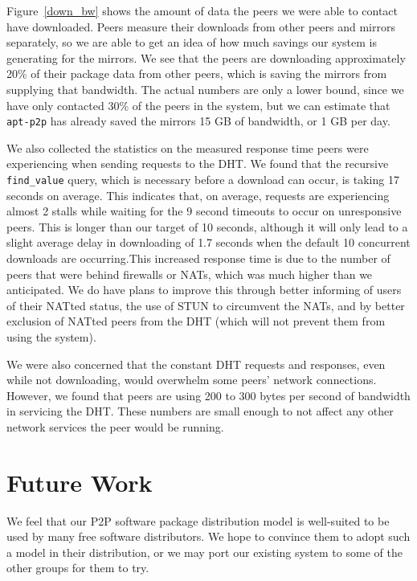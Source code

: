 \documentclass[conference]{IEEEtran}
\begin{document}
Figure~\ref{down_bw} shows the amount of data the peers we were able
to contact have downloaded. Peers measure their downloads from other
peers and mirrors separately, so we are able to get an idea of how
much savings our system is generating for the mirrors. We see that
the peers are downloading approximately 20\% of their package data
from other peers, which is saving the mirrors from supplying that
bandwidth. The actual numbers are only a lower bound, since we have
only contacted 30\% of the peers in the system, but we can estimate
that \texttt{apt-p2p} has already saved the mirrors 15 GB of
bandwidth, or 1 GB per day.

We also collected the statistics on the measured response time peers
were experiencing when sending requests to the DHT. We found that
the recursive \texttt{find\_value} query, which is necessary before
a download can occur, is taking 17 seconds on average. This
indicates that, on average, requests are experiencing almost 2
stalls while waiting for the 9 second timeouts to occur on
unresponsive peers. This is longer than our target of 10 seconds,
although it will only lead to a slight average delay in downloading
of 1.7 seconds when the default 10 concurrent downloads are
occurring.This increased response time is due to the number of peers
that were behind firewalls or NATs, which was much higher than we
anticipated. We do have plans to improve this through better
informing of users of their NATted status, the use of STUN
\cite{STUN} to circumvent the NATs, and by better exclusion of
NATted peers from the DHT (which will not prevent them from using
the system).

We were also concerned that the constant DHT requests and responses,
even while not downloading, would overwhelm some peers' network
connections. However, we found that peers are using 200 to 300 bytes
per second of bandwidth in servicing the DHT. These numbers are
small enough to not affect any other network services the peer would
be running.


\section{Future Work}
\label{future}

We feel that our P2P software package distribution model is
well-suited to be used by many free software distributors. We hope
to convince them to adopt such a model in their distribution, or we
may port our existing system to some of the other groups for them to
try.
\end{document}
